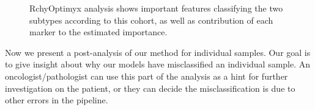 \begin{figure}[!ht]
  \caption{RchyOptimyx analysis shows important features classifying the two subtypes according to this cohort, as well as contribution of each marker to the estimated importance.}
  \label{fig:fcs-qa-rchy1}
\end{figure}

Now we present a post-analysis of our method for individual samples. Our goal is to give insight about why our models have misclassified an individual sample. An oncologist/pathologist can use this part of the analysis as a hint for further investigation on the patient, or they can decide the misclassification is due to other errors in the pipeline.


